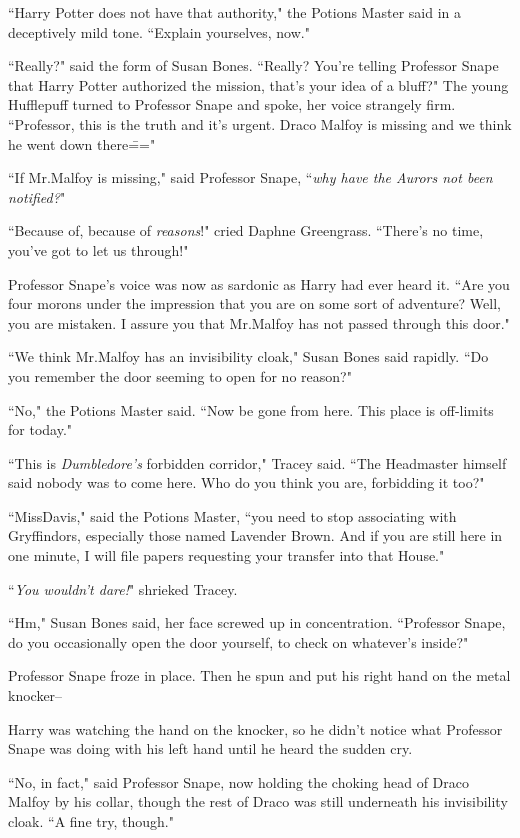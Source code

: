 ``Harry Potter does not have that authority," the Potions Master said in a deceptively mild tone. ``Explain yourselves, now."

``Really?" said the form of Susan Bones. ``Really? You're telling Professor Snape that Harry Potter authorized the mission, that's your idea of a bluff?" The young Hufflepuff turned to Professor Snape and spoke, her voice strangely firm. ``Professor, this is the truth and it's urgent. Draco Malfoy is missing and we think he went down there\==="

``If Mr.\?Malfoy is missing," said Professor Snape, ``\emph{why have the Aurors not been notified?}"

``Because of, because of \emph{reasons}!" cried Daphne Greengrass. ``There's no time, you've got to let us through!"

Professor Snape's voice was now as sardonic as Harry had ever heard it. ``Are you four morons under the impression that you are on some sort of adventure? Well, you are mistaken. I assure you that Mr.\?Malfoy has not passed through this door."

``We think Mr.\?Malfoy has an invisibility cloak," Susan Bones said rapidly. ``Do you remember the door seeming to open for no reason?"

``No," the Potions Master said. ``Now be gone from here. This place is off-limits for today."

``This is \emph{Dumbledore's} forbidden corridor," Tracey said. ``The Headmaster himself said nobody was to come here. Who do you think you are, forbidding it too?"

``Miss\?Davis," said the Potions Master, ``you need to stop associating with Gryffindors, especially those named Lavender Brown. And if you are still here in one minute, I will file papers requesting your transfer into that House."

``\emph{You wouldn't dare!}" shrieked Tracey.

``Hm," Susan Bones said, her face screwed up in concentration. ``Professor Snape, do you occasionally open the door yourself, to check on whatever's inside?"

Professor Snape froze in place. Then he spun and put his right hand on the metal knocker\---

Harry was watching the hand on the knocker, so he didn't notice what Professor Snape was doing with his left hand until he heard the sudden cry.

``No, in fact," said Professor Snape, now holding the choking head of Draco Malfoy by his collar, though the rest of Draco was still underneath his invisibility cloak. ``A fine try, though."

